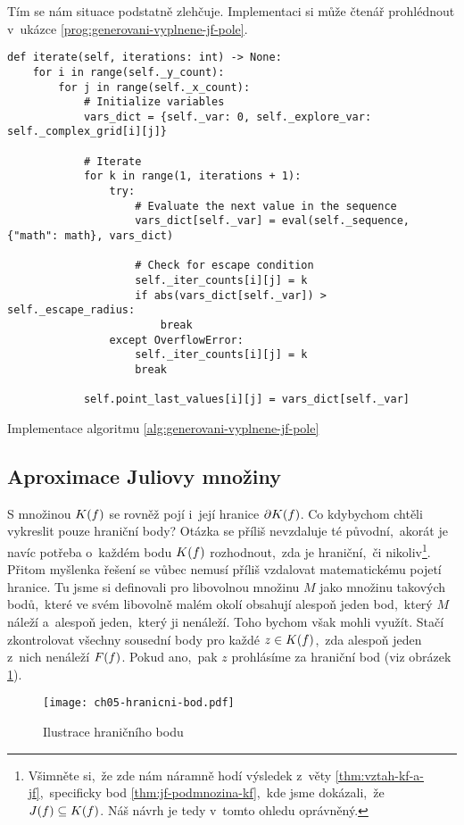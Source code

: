 Tím se nám situace podstatně zlehčuje. Implementaci si může čtenář prohlédnout v~ukázce \ref{prog:generovani-vyplnene-jf-pole}.
\begin{program}[h]
\begin{lstlisting}[style=python]
def iterate(self, iterations: int) -> None:
    for i in range(self._y_count):
        for j in range(self._x_count):
            # Initialize variables
            vars_dict = {self._var: 0, self._explore_var: self._complex_grid[i][j]}

            # Iterate
            for k in range(1, iterations + 1):
                try:
                    # Evaluate the next value in the sequence
                    vars_dict[self._var] = eval(self._sequence, {"math": math}, vars_dict)

                    # Check for escape condition
                    self._iter_counts[i][j] = k
                    if abs(vars_dict[self._var]) > self._escape_radius:
                        break
                except OverflowError:
                    self._iter_counts[i][j] = k
                    break
            
            self.point_last_values[i][j] = vars_dict[self._var]
\end{lstlisting}
    \caption{Implementace algoritmu \ref{alg:generovani-vyplnene-jf-pole}}
    \label{prog:generovani-vyplnene-jf-pole}
\end{program}

\subsection{Aproximace Juliovy množiny}\label{subsec:aproximace-juliovy-mnoziny}

S množinou $K(f)$ se rovněž pojí i~její hranice $\partial K(f)$. Co kdybychom chtěli vykreslit pouze hraniční body? Otázka se příliš nevzdaluje té původní,~akorát je navíc potřeba o~každém bodu $K(f)$ rozhodnout,~zda je hraniční,~či nikoliv\footnote{Všimněte si,~že zde nám náramně hodí výsledek z~věty \ref{thm:vztah-kf-a-jf},~specificky bod \ref{thm:jf-podmnozina-kf},~kde jsme dokázali,~že $J(f)\subseteq K(f)$. Náš návrh je tedy v~tomto ohledu oprávněný.}. Přitom myšlenka řešení se vůbec nemusí příliš vzdalovat matematickému pojetí hranice. Tu jsme si definovali pro libovolnou množinu $M$ jako množinu takových bodů,~které ve svém libovolně malém okolí obsahují alespoň jeden bod,~který $M$ náleží a~alespoň jeden,~který ji nenáleží. Toho bychom však mohli využít. Stačí zkontrolovat všechny sousední body pro každé $z\in K(f)$,~zda alespoň jeden z~nich nenáleží $F(f)$. Pokud ano,~pak $z$ prohlásíme za hraniční bod (viz obrázek \ref{fig:hranicni-bod}).
\begin{figure}[h]
    \centering
    \texttt{[image: ch05-hranicni-bod.pdf]}
    \caption{Ilustrace hraničního bodu}
    \label{fig:hranicni-bod}
\end{figure}

